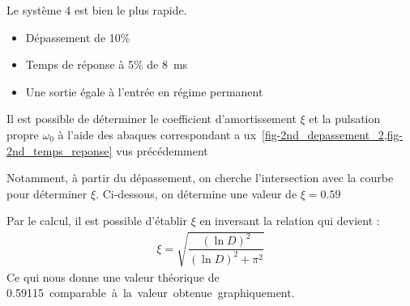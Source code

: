 Le système 4 est bien le plus rapide.
\begin{itemize}
    \item Dépassement de 10\%
    \item Temps de réponse à 5\% de \SI{8}{\milli\second}
    \item Une sortie égale à l'entrée en régime permanent 
\end{itemize}
Il est possible de déterminer le coefficient d'amortissement $\xi$ et la 
pulsation propre $\omega_0$ à l'aide des abaques correspondant a
ux~\cref{fig-2nd_depassement_2,fig-2nd_temps_reponse} vus précédemment

Notamment, à partir du dépassement, on cherche l'intersection avec la courbe
pour déterminer $\xi$. Ci-dessous, on détermine une valeur de $\xi=0.59$
\begin{center}

\end{center}
Par le calcul, il est possible d'établir $\xi$ en inversant la relation
 qui devient :
\begin{align*}
    \xi=\sqrt{\dfrac{(\ln D)^2}{(\ln D)^2+\pi^2}}
\end{align*}
Ce qui nous donne une valeur théorique de \SI{0.59115} comparable à la valeur
obtenue graphiquement.

